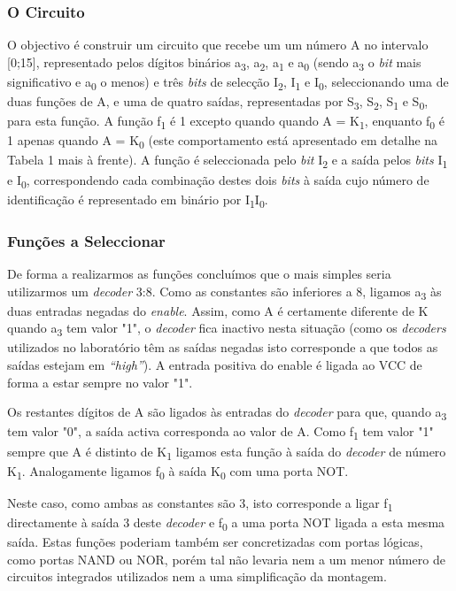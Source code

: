 \documentclass[a4paper,12pt]{article}
\begin{document}
\subsubsection{O Circuito}
O objectivo é construir um circuito que recebe um um número A no intervalo [0;15], representado pelos dígitos binários a\textsubscript{3}, a\textsubscript{2}, a\textsubscript{1} e a\textsubscript{0} (sendo a\textsubscript{3} o {\it bit} mais significativo e a\textsubscript{0} o menos) e três {\it bits} de selecção I\textsubscript{2}, I\textsubscript{1} e I\textsubscript{0}, seleccionando uma de duas funções de A, e uma de quatro saídas, representadas por S\textsubscript{3}, S\textsubscript{2}, S\textsubscript{1} e S\textsubscript{0}, para esta função. A função f\textsubscript{1} é 1 excepto quando quando A = K\textsubscript{1}, enquanto f\textsubscript{0} é 1 apenas quando A = K\textsubscript{0} (este comportamento está apresentado em detalhe na Tabela 1 mais à frente). A função é seleccionada pelo {\it bit} I\textsubscript{2} e a saída pelos {\it bits} I\textsubscript{1} e I\textsubscript{0}, correspondendo cada combinação destes dois {\it bits} à saída cujo número de identificação é representado em binário por I\textsubscript{1}I\textsubscript{0}.
\par
\subsubsection{Funções a Seleccionar}
De forma a realizarmos as funções concluímos que o mais simples seria utilizarmos um {\it decoder} 3:8. Como as constantes são inferiores a 8, ligamos a\textsubscript{3} às duas entradas negadas do {\it enable}. Assim, como A é certamente diferente de K quando a\textsubscript{3} tem valor "1", o {\it decoder} fica inactivo nesta situação (como os {\it decoders} utilizados no laboratório têm as saídas negadas isto corresponde a que todos as saídas estejam em {\it ``high''}). A entrada positiva do enable é ligada ao VCC de forma a estar sempre no valor "1". 
\par
Os restantes dígitos de A são ligados às entradas do {\it decoder} para que, quando a\textsubscript{3} tem valor "0", a saída activa corresponda ao valor de A. Como f\textsubscript{1} tem valor "1" sempre que A é distinto de K\textsubscript{1} ligamos esta função à saída do {\it decoder} de número K\textsubscript{1}. Analogamente ligamos f\textsubscript{0} à saída K\textsubscript{0} com uma porta NOT.
\par
Neste caso, como ambas as constantes são 3, isto corresponde a ligar f\textsubscript{1} directamente à saída 3 deste {\it decoder} e f\textsubscript{0} a uma porta NOT ligada a esta mesma saída. Estas funções poderiam também ser concretizadas com portas lógicas, como portas NAND ou NOR, porém tal não levaria nem a um menor número de circuitos integrados utilizados nem a uma simplificação da montagem.
\par
\end{document}
